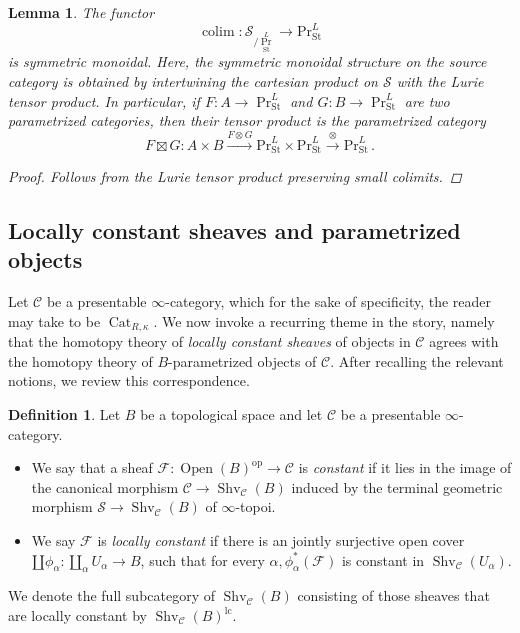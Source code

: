 \documentclass[10pt]{amsart}
\newcommand{\longto}{\longrightarrow}
\theoremstyle{plain}
\newtheorem{lemma}[theorem]{Lemma}
\theoremstyle{definition}
\newtheorem{definition}[theorem]{Definition}
\DeclareMathOperator*{\colim}{colim}
\DeclareMathOperator{\Shv}{Shv}
\DeclareMathOperator{\Open}{Open}
\DeclareMathOperator{\Cat}{Cat}
\newcommand{\St}{\mathrm{St}}
\newcommand{\oop}{\mathrm{op}}
\newcommand{\cC}{\mathcal{C}}
\newcommand{\cS}{\mathcal{S}}
\begin{document}
\begin{lemma}\label{lem:colim_symm_monoid}
  The functor
  \[
  \colim : \cS_{/\Pr^{L}_{\St}} \longto \mathrm{Pr}^{L}_{\St}
  \]
  is symmetric monoidal.
  Here, the symmetric monoidal structure on the source category is obtained by intertwining the cartesian product on $\cS$ with the Lurie tensor product.
  In particular, if $F : A \to \Pr^{L}_{\St}$ and $G : B \to \Pr^{L}_{\St}$ are two parametrized categories, then their tensor product is the parametrized category
  \[
  F \boxtimes G : A \times B \overset{F \otimes G}\longto \mathrm{Pr}^{L}_{\St} \times \mathrm{Pr}^{L}_{\St} \overset{\otimes}\longto \mathrm{Pr}^{L}_{\St} \,.
  \]
  \begin{proof}
    Follows from the Lurie tensor product preserving small colimits.
  \end{proof}
\end{lemma}


\subsection{Locally constant sheaves and parametrized objects}
Let $\cC$ be a presentable $\infty$-category, which for the sake of specificity, the reader may take to be $\Cat_{R, \kappa}$.
We now invoke a recurring theme in the story, namely that the homotopy theory of \emph{locally constant sheaves} of objects in $\cC$ agrees with the homotopy theory of $B$-parametrized objects of $\cC$.
After recalling the relevant notions, we review this correspondence.

\begin{definition}
    Let $B$ be a topological space and let $\cC$ be a presentable $\infty$-category.
    \begin{itemize}
      \item We say that a sheaf $\mathcal{F} : \Open(B)^{\oop} \to \cC$ is \emph{constant} if it lies in the image of the canonical morphism $\cC \to \Shv_{\cC}(B)$ induced by the terminal geometric morphism $\cS \to \Shv_{\cC}(B)$ of $\infty$-topoi.
      \item We say $\mathcal{F}$ is \emph{locally constant} if there is an jointly surjective open cover $ \amalg \phi_{\alpha}: \amalg_{\alpha} U_{\alpha} \to B$, such that for every $\alpha, \phi_{\alpha}^*( \mathcal{F})$  is  constant in $\Shv_{\cC}(U_\alpha)$.
    \end{itemize}
We denote the full subcategory of $\Shv_{\cC}(B)$ consisting of those sheaves that are locally constant by $\Shv_{\cC}(B)^{\mathrm{lc}}$.
\end{definition}
\end{document}
